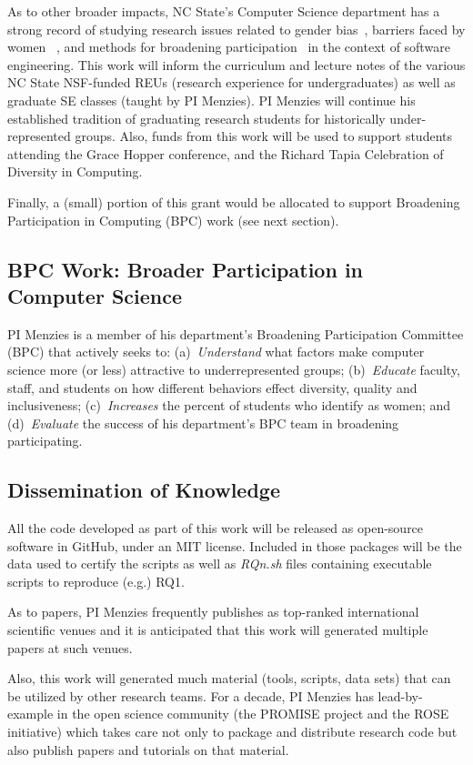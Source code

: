  
 
As to other broader impacts, NC State's Computer Science department has a strong record of studying research issues related to gender bias~\cite{pullreq_17}, barriers faced by women ~\cite{ford2016paradise}, and methods for broadening participation~\cite{selfies} in the context of software engineering. 
 This work will inform the curriculum  and lecture notes of the various NC State NSF-funded REUs (research experience for undergraduates) as well as graduate
SE classes (taught by PI Menzies).  
PI Menzies will continue his established tradition of graduating research students for historically under-represented groups.
Also, funds from this work will be used to support students attending the Grace Hopper conference,
and the Richard Tapia Celebration  of Diversity in Computing.



Finally,  a (small) portion of this grant would be allocated to support Broadening Participation in Computing (BPC) work
(see next section).

 
 
 

\subsection{BPC Work: Broader Participation in Computer Science} \label{bpc}



  PI Menzies is a member of
his department's Broadening Participation Committee (BPC) that actively seeks to:
(a)~{\em Understand} what factors make computer science
more (or less) attractive to underrepresented groups;
(b)~{\em Educate} faculty, staff, and students on how different behaviors   effect diversity, quality and inclusiveness;
(c)~{\em Increases} the percent of students who identify as women; 
and (d)~{\em Evaluate} the success of his department's BPC team in broadening
participating.
 

 
\subsection{Dissemination of Knowledge}

All the code developed as part of this work will be  released as open-source software in GitHub, under an MIT license.  Included in those
packages will be the data used to certify the scripts as well as {\em RQn.sh} files containing executable scripts to reproduce (e.g.) RQ1.

  As to papers, PI Menzies frequently publishes as top-ranked international scientific venues and it is  anticipated that this work will generated multiple papers at
such venues. 

Also, this work will generated much  material (tools, scripts, data sets) that can be utilized by other research teams. 
For  a decade, PI Menzies has  lead-by-example in the open science community (the PROMISE project and the ROSE initiative) which takes care
not only to package and distribute research code but also publish papers and tutorials on that material.  
 
